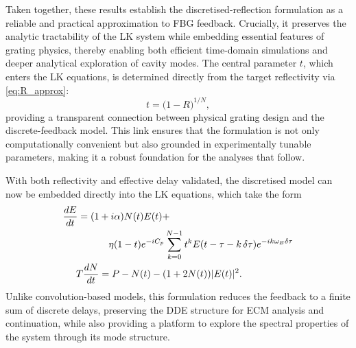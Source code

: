 %
\par
%
Taken together, these results establish the discretised-reflection formulation as a reliable and practical approximation to FBG feedback.
Crucially, it preserves the analytic tractability of the LK system while embedding essential features of grating physics, thereby enabling both efficient time-domain simulations and deeper analytical exploration of cavity modes.
The central parameter $t$, which enters the LK equations, is determined directly from the target reflectivity via \eqref{eq:R_approx}:
%
\begin{equation}
\label{eq:discretised_t}
t = \big(1-R\big)^{1/N},
\end{equation}
%
providing a transparent connection between physical grating design and the discrete-feedback model.
This link ensures that the formulation is not only computationally convenient but also grounded in experimentally tunable parameters, making it a robust foundation for the analyses that follow.
%
\par
%
With both reflectivity and effective delay validated, the discretised model can now be embedded directly into the LK equations, which take the form
%
\begin{equation}
\label{eq:LK_discretised}
    \begin{aligned}
        \frac{d E}{d t} = (1 &+i \alpha) N(t) E(t) + \\
                        &\quad \eta (1-t) e^{-i C_p} \sum_{k=0}^{N-1} t^k E(t-\tau-k\, \delta \tau) e^{-i k \omega_B \delta \tau} \\
        T \frac{d N}{d t} &= P-N(t)-(1+2 N(t))|E(t)|^2.
    \end{aligned}
\end{equation}
%
Unlike convolution-based models, this formulation reduces the feedback to a finite sum of discrete delays, preserving the DDE structure for ECM analysis and continuation, while also providing a platform to explore the spectral properties of the system through its mode structure.
%
%
